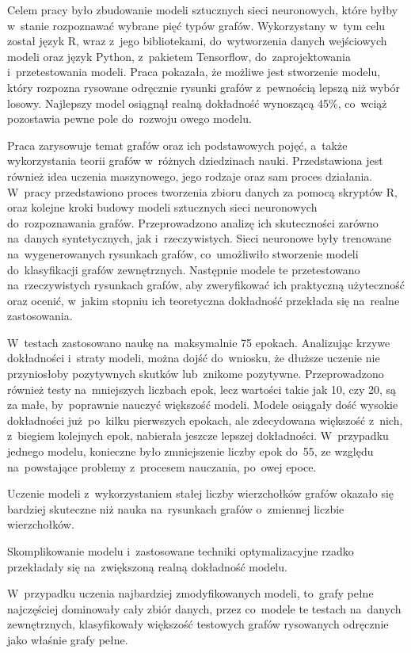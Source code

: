 Celem pracy było zbudowanie modeli sztucznych sieci neuronowych,
które byłby w~stanie rozpoznawać wybrane pięć typów grafów.
Wykorzystany w~tym celu został język R, wraz z~jego bibliotekami, do~wytworzenia danych wejściowych modeli
oraz język Python, z~pakietem Tensorflow, do~zaprojektowania i~przetestowania modeli.
Praca pokazała, że możliwe jest stworzenie modelu, który rozpozna rysowane odręcznie rysunki grafów
z~pewnością lepszą niż wybór losowy.
Najlepszy model osiągnął realną dokładność wynoszącą 45\%,
co~wciąż pozostawia pewne pole do~rozwoju owego modelu.

Praca zarysowuje temat grafów oraz ich podstawowych pojęć,
a~także wykorzystania teorii grafów w~różnych dziedzinach nauki.
Przedstawiona jest również idea uczenia maszynowego,
jego rodzaje oraz sam proces działania.
W~pracy przedstawiono proces tworzenia zbioru danych za pomocą skryptów R,
oraz kolejne kroki budowy modeli sztucznych sieci neuronowych do~rozpoznawania grafów.
Przeprowadzono analizę ich skuteczności zarówno na~danych syntetycznych, jak i~rzeczywistych.
Sieci neuronowe były trenowane na~wygenerowanych rysunkach grafów,
co~umożliwiło stworzenie modeli do~klasyfikacji grafów zewnętrznych.
Następnie modele te przetestowano na~rzeczywistych rysunkach grafów,
aby zweryfikować ich praktyczną użyteczność oraz ocenić,
w~jakim stopniu ich teoretyczna dokładność przekłada się na~realne zastosowania.

W~testach zastosowano naukę na~maksymalnie 75 epokach.
Analizując krzywe dokładności i~straty modeli, można dojść do~wniosku,
że dłuższe uczenie nie przyniosłoby pozytywnych skutków lub~znikome pozytywne.
Przeprowadzono również testy na~mniejszych liczbach epok, lecz wartości takie jak 10, czy 20,
są za małe, by~poprawnie nauczyć większość modeli.
Modele osiągały dość wysokie dokładności już~po~kilku pierwszych epokach,
ale zdecydowana większość z~nich, z~biegiem kolejnych epok, nabierała jeszcze lepszej dokładności.
W~przypadku jednego modelu, konieczne było zmniejszenie liczby epok do~55,
ze względu na~powstające problemy z~procesem nauczania, po~owej epoce.

Uczenie modeli z~wykorzystaniem stałej liczby wierzchołków grafów okazało się bardziej skuteczne
niż nauka na~rysunkach grafów o~zmiennej liczbie wierzchołków.

Skomplikowanie modelu i~zastosowane techniki optymalizacyjne rzadko przekładały się na~zwiększoną realną dokładność modelu.

W~przypadku uczenia najbardziej zmodyfikowanych modeli, to~grafy pełne najczęściej dominowały cały zbiór danych,
przez co~modele te testach na~danych zewnętrznych,
klasyfikowały większość testowych grafów rysowanych odręcznie jako właśnie grafy pełne.

